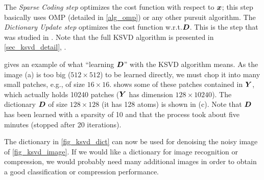 \noindent
The \emph{Sparse Coding step} optimizes the cost function with respect to $\bm{x}$; this step basically uses \ac{OMP} (detailed in \cref{alg_omp}) or any other pursuit algorithm. The \emph{Dictionary Update step} optimizes the cost function w.r.t.\@ $\bm{D}$. This is the step that was studied in \cite{chabiron_optimization_2016}. Note that the full \ac{KSVD} algorithm is presented in \cref{sec_ksvd_detail}, .

\noindent
{} gives an example of what “learning $\bm{D}$” with the \ac{KSVD} algorithm means. As the image (a) is too big ($512 \times 512$) to be learned directly, we must chop it into many small patches, e.g., of size $16 \times 16$.  shows some of these patches contained in $\bm{Y}$, which actually holds 10240 patches ($\bm{Y}$ has dimension $128 \times 10240$). The dictionary $\bm{D}$ of size $128 \times 128$ (it has 128 atoms) is shown in (c). Note that $\bm{D}$ has been learned with a sparsity of 10 and that the process took about five minutes (stopped after 20 iterations).

\noindent
The dictionary in \cref{fig_ksvd_dict} can now be used for denoising the noisy image of \cref{fig_ksvd_image}. If we would like a dictionary for image recognition or compression, we would probably need many additional images in order to obtain a good classification or compression performance.

